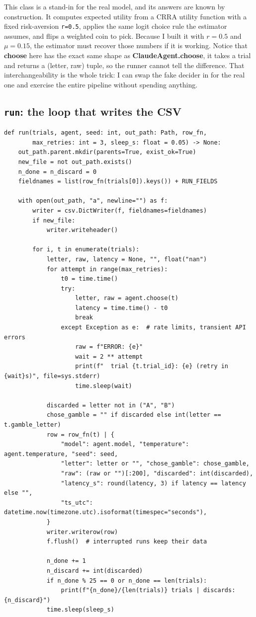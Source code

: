 \documentclass[11pt]{article}
\newcommand{\file}[1]{\textbf{\ttfamily #1}}
\begin{document}
This class is a stand-in for the real model, and its answers are known by construction. It computes
expected utility from a CRRA utility function with a fixed risk-aversion \verb|r=0.5|, applies the
same logit choice rule the estimator assumes, and flips a weighted coin to pick. Because I built it
with $r = 0.5$ and $\mu = 0.15$, the estimator must recover those numbers if it is working. Notice
that \file{choose} here has the exact same shape as \file{ClaudeAgent.choose}, it takes a trial and
returns a (letter, raw) tuple, so the runner cannot tell the difference. That interchangeability is
the whole trick: I can swap the fake decider in for the real one and exercise the entire pipeline
without spending anything.

\subsection{\texttt{run}: the loop that writes the CSV}

\begin{lstlisting}[style=py,firstnumber=179]
def run(trials, agent, seed: int, out_path: Path, row_fn,
        max_retries: int = 3, sleep_s: float = 0.05) -> None:
    out_path.parent.mkdir(parents=True, exist_ok=True)
    new_file = not out_path.exists()
    n_done = n_discard = 0
    fieldnames = list(row_fn(trials[0]).keys()) + RUN_FIELDS

    with open(out_path, "a", newline="") as f:
        writer = csv.DictWriter(f, fieldnames=fieldnames)
        if new_file:
            writer.writeheader()

        for i, t in enumerate(trials):
            letter, raw, latency = None, "", float("nan")
            for attempt in range(max_retries):
                t0 = time.time()
                try:
                    letter, raw = agent.choose(t)
                    latency = time.time() - t0
                    break
                except Exception as e:  # rate limits, transient API errors
                    raw = f"ERROR: {e}"
                    wait = 2 ** attempt
                    print(f"  trial {t.trial_id}: {e} (retry in {wait}s)", file=sys.stderr)
                    time.sleep(wait)

            discarded = letter not in ("A", "B")
            chose_gamble = "" if discarded else int(letter == t.gamble_letter)
            row = row_fn(t) | {
                "model": agent.model, "temperature": agent.temperature, "seed": seed,
                "letter": letter or "", "chose_gamble": chose_gamble,
                "raw": (raw or "")[:200], "discarded": int(discarded),
                "latency_s": round(latency, 3) if latency == latency else "",
                "ts_utc": datetime.now(timezone.utc).isoformat(timespec="seconds"),
            }
            writer.writerow(row)
            f.flush()  # interrupted runs keep their data

            n_done += 1
            n_discard += int(discarded)
            if n_done % 25 == 0 or n_done == len(trials):
                print(f"{n_done}/{len(trials)} trials | discards: {n_discard}")
            time.sleep(sleep_s)
\end{lstlisting}
\end{document}

